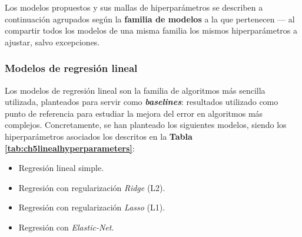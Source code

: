 Los modelos propuestos y sus mallas de hiperparámetros se describen a continuación agrupados según la \textbf{familia de modelos} a la que pertenecen --- al compartir todos los modelos de una misma familia los mismos hiperparámetros a ajustar, salvo excepciones.

\subsubsection{Modelos de regresión lineal}

Los modelos de regresión lineal son la familia de algoritmos más sencilla utilizada, planteados para servir como \textbf{\textit{baselines}}: resultados utilizado como punto de referencia para estudiar la mejora del error en algoritmos más complejos. Concretamente, se han planteado los siguientes modelos, siendo los hiperparámetros asociados los descritos en la \textbf{Tabla \ref{tab:ch5linealhyperparameters}}:

\begin{itemize}[parsep=1pt, itemsep=0pt, topsep=1pt]
	\item Regresión lineal simple.
	\item Regresión con regularización \textit{Ridge} (L2).
	\item Regresión con regularización \textit{Lasso} (L1).
	\item Regresión con \textit{Elastic-Net}.
\end{itemize}

